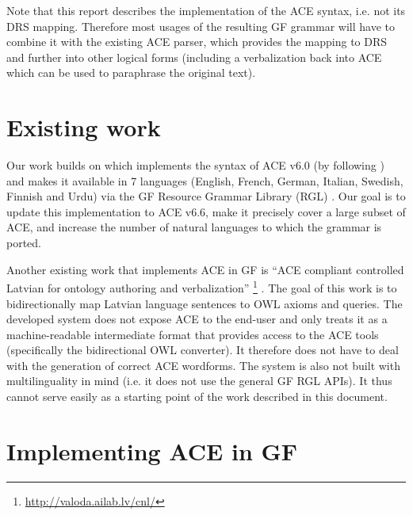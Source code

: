 \documentclass[a4paper]{article}
\begin{document}
Note that this report describes the implementation of the ACE syntax,
i.e. not its DRS mapping. Therefore most usages of the resulting GF grammar
will have to combine it with the existing ACE parser, which provides the
mapping to DRS and further into other logical forms (including a verbalization
back into ACE which can be used to paraphrase the original text).


\section{Existing work}
\label{section:Existing_work}

Our work builds on \cite{ranta:cnl2009_revised} which implements the syntax
of ACE v6.0 (by following \cite{ACE_6.0_Construction_Rules}) and makes it
available in 7 languages (English, French, German, Italian, Swedish, Finnish
and Urdu) via the GF Resource Grammar Library (RGL) \cite{ranta:lilt2009}.
Our goal is to update this implementation to ACE v6.6, make it precisely
cover a large subset of ACE, and increase the number of natural languages to
which the grammar is ported.

Another existing work that implements ACE in GF is
``ACE compliant controlled Latvian for ontology authoring and verbalization''
\footnote{\url{http://valoda.ailab.lv/cnl/}}
\cite{gruzitis:phd}. The goal of this work is to bidirectionally map Latvian
language sentences to OWL axioms and queries. The developed system
does not expose ACE to the end-user and only treats it as a
machine-readable intermediate format that provides access to the ACE tools
(specifically the bidirectional OWL converter).
It therefore does not have to deal with the
generation of correct ACE wordforms.
The system is also not built with multilinguality in mind
(i.e. it does not use the general GF RGL APIs). It thus cannot serve easily as
a starting point of the work described in this document.


\section{Implementing ACE in GF}
\label{section:Implementing_ACE_in_GF}
\end{document}
